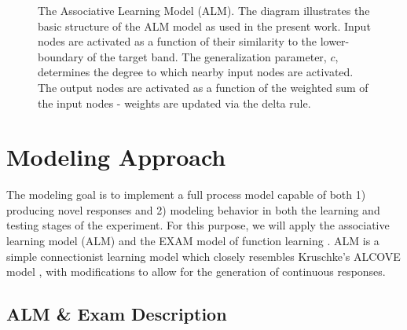 \documentclass[
  12pt,
  letterpaper,
]{article}
\begin{document}
\begin{figure}


\caption{\label{fig-alm-diagram}The Associative Learning Model (ALM).
The diagram illustrates the basic structure of the ALM model as used in
the present work. Input nodes are activated as a function of their
similarity to the lower-boundary of the target band. The generalization
parameter, \(c\), determines the degree to which nearby input nodes are
activated. The output nodes are activated as a function of the weighted
sum of the input nodes - weights are updated via the delta rule.}

\end{figure}%

\section{Modeling Approach}\label{modeling-approach}

The modeling goal is to implement a full process model capable of both
1) producing novel responses and 2) modeling behavior in both the
learning and testing stages of the experiment. For this purpose, we will
apply the associative learning model (ALM) and the EXAM model of
function learning \autocite{deloshExtrapolationSineQua1997}. ALM is a
simple connectionist learning model which closely resembles Kruschke's
ALCOVE model \autocite{kruschkeALCOVEExemplarbasedConnectionist1992},
with modifications to allow for the generation of continuous responses.

\subsection{ALM \& Exam Description}\label{alm-exam-description}
\end{document}

